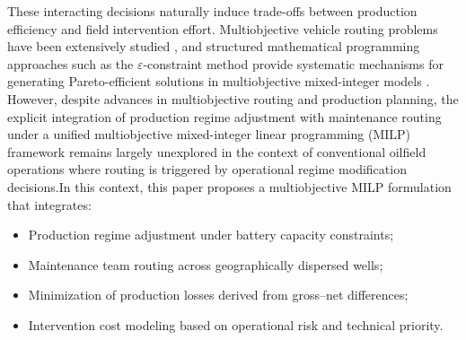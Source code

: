 
These interacting decisions naturally induce trade-offs between production efficiency and field intervention effort. Multiobjective vehicle routing problems have been extensively studied \cite{JOZEFOWIEZ2008293}, and structured mathematical programming approaches such as the $\varepsilon$-constraint method provide systematic mechanisms for generating Pareto-efficient solutions in multiobjective mixed-integer models \cite{MAVROTAS2009455} \cite{10.1007/978-3-319-15892-1_8}. However, despite advances in multiobjective routing and production planning, the explicit integration of production regime adjustment with maintenance routing under a unified multiobjective mixed-integer linear programming (MILP) framework remains largely unexplored in the context of conventional oilfield operations where routing is triggered by operational regime modification decisions.In this context, this paper proposes a multiobjective MILP formulation that integrates:

\begin{itemize}
    \item Production regime adjustment under battery capacity constraints;
    \item Maintenance team routing across geographically dispersed wells;
    \item Minimization of production losses derived from gross–net differences;
    \item Intervention cost modeling based on operational risk and technical priority.
\end{itemize}

